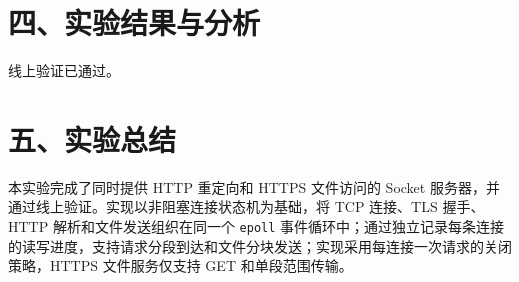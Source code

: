 \documentclass[UTF8,11pt,a4paper,fontset=fandol]{ctexart}
\begin{document}
\section*{四、实验结果与分析}

线上验证已通过。


\section*{五、实验总结}

本实验完成了同时提供 HTTP 重定向和 HTTPS 文件访问的 Socket 服务器，并通过线上验证。实现以非阻塞连接状态机为基础，将 TCP 连接、TLS 握手、HTTP 解析和文件发送组织在同一个 \texttt{epoll} 事件循环中；通过独立记录每条连接的读写进度，支持请求分段到达和文件分块发送；实现采用每连接一次请求的关闭策略，HTTPS 文件服务仅支持 GET 和单段范围传输。
\end{document}
